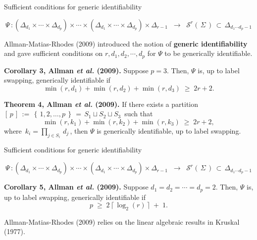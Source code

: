 
\begin{frame}{\Large Sufficient conditions for generic identifiability}

\scriptsize
\begin{equation*}
\Psi \, :
\left(\Delta_{d_{1}} \times \cdots \times \Delta_{d_{p}}\right)
\times \cdots \times
\left(\Delta_{d_{1}} \times \cdots \times \Delta_{d_{p}}\right)
\times
\Delta_{r-1}
\;\;\longrightarrow\;\;
\mathcal{S}^{r}\!\left(\,\Sigma\,\right) \,\subset\, \Delta_{d_{1}\cdots d_{p} - 1}
\end{equation*}

\pause
\scriptsize
\vskip 0.5cm
Allman-Matias-Rhodes (2009) introduced the notion of \textbf{\color{red}generic identifiability} and
gave sufficient conditions on $r, d_{1}, d_{2}, \cdots, d_{p}$ for $\Psi$ to be generically identifiable.

\pause
\vskip 0.5cm
\scriptsize
\textbf{Corollary 3, Allman \textit{et al.} (2009).}\quad
Suppose $p = 3$. Then, $\Psi$ is, up to label swapping, generically identifiable if
\begin{equation*}
\min(r,d_{1}) + \min(r,d_{2}) + \min(r,d_{3}) \;\geq\; 2r+2.
\end{equation*}

\pause
\vskip 0.5cm
\textbf{Theorem 4, Allman \textit{et al.} (2009).}\quad
If there exists a partition
\,$[\,p\,] \,:=\, \left\{\,1,2,\ldots,p\,\right\} \,=\, S_{1} \sqcup S_{2} \sqcup S_{3}$\,
such that
\begin{equation*}
\min(r,k_{1}) + \min(r,k_{2}) + \min(r,k_{3}) \;\geq\; 2r+2,
\end{equation*}
where \,$k_{i} = \underset{j \in S_{i}}{\prod}\,d_{j}$\,,
then $\Psi$ is generically identifiable, up to label swapping.

\end{frame}
\normalsize

\begin{frame}{\Large Sufficient conditions for generic identifiability}

\scriptsize
\begin{equation*}
\Psi \, :
\left(\Delta_{d_{1}} \times \cdots \times \Delta_{d_{p}}\right)
\times \cdots \times
\left(\Delta_{d_{1}} \times \cdots \times \Delta_{d_{p}}\right)
\times
\Delta_{r-1}
\;\;\longrightarrow\;\;
\mathcal{S}^{r}\!\left(\,\Sigma\,\right) \,\subset\, \Delta_{d_{1}\cdots d_{p} - 1}
\end{equation*}

\pause
\small
\vskip 0.8cm
\textbf{Corollary 5, Allman \textit{et al.} (2009).}\quad
Suppose $d_{1} = d_{2} = \cdots = d_{p} = 2$. Then, $\Psi$ is, up to label swapping, generically identifiable if
\begin{equation*}
p \;\geq\; 2\,\lceil\, \log_{2}(r) \,\rceil \;+\; 1.
\end{equation*}

\pause
\small
\vskip 0.8cm
Allman-Matias-Rhodes (2009) relies on the linear algebraic results in Kruskal (1977).

\end{frame}
\normalsize

